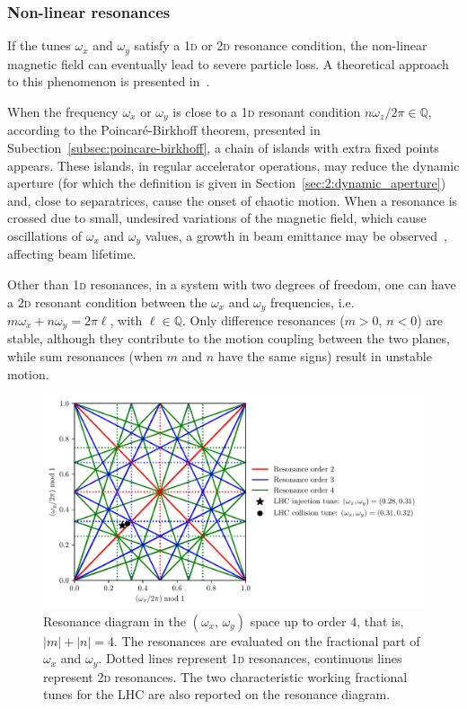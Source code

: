 \subsubsection{Non-linear resonances}

If the tunes $\omega_x$ and $\omega_y$ satisfy a 1\textsc{d} or 2\textsc{d} resonance condition, the non-linear magnetic field can eventually lead to severe particle loss. A theoretical approach to this phenomenon is presented in~\cite{Bazzani:262179, wilson}.

When the frequency $\omega_x$ or $\omega_y$ is close to a 1\textsc{d} resonant condition $n\omega_z / 2\pi \in \mathbb{Q}$, according to the Poincaré-Birkhoff theorem, presented in Subection~\ref{subsec:poincare-birkhoff}, a chain of islands with extra fixed points appears. These islands, in regular accelerator operations, may reduce the dynamic aperture (for which the definition is given in Section~\ref{sec:2:dynamic_aperture}) and, close to separatrices, cause the onset of chaotic motion. When a resonance is crossed due to small, undesired variations of the magnetic field, which cause oscillations of $\omega_x$ and $\omega_y$ values, a growth in beam emittance may be observed~\cite{Guignard:185921}, affecting beam lifetime.

Other than 1\textsc{d} resonances, in a system with two degrees of freedom, one can have a 2\textsc{d} resonant condition between the $\omega_x$ and $\omega_y$ frequencies, i.e.\ $m\omega_x+n\omega_y = 2\pi\ell$, with $\ell \in \mathbb{Q}$. Only difference resonances ($m>0$, $n<0$) are stable, although they contribute to the motion coupling between the two planes, while sum resonances (when $m$ and $n$ have the same signs) result in unstable motion.

\begin{figure}
	\centering
	\includegraphics[width=.85\textwidth]{2_accelerator_physics_fundamentals/figs/tune_space.pdf}
	\caption{Resonance diagram in the $(\omega_x,\,\omega_y)$ space up to order $4$, that is, $|m|+|n| = 4$. The resonances are evaluated on the fractional part of $\omega_x$ and $\omega_y$. Dotted lines represent 1\textsc{d} resonances, continuous lines represent 2\textsc{d} resonances. The two characteristic working fractional tunes for the LHC are also reported on the resonance diagram.}
	\label{fig:res}
\end{figure}

